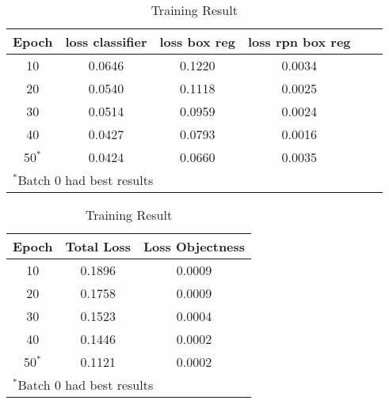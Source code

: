 \documentclass[conference]{IEEEtran}
\begin{document}
    \begin{table}[htbp]
        \centering
        \caption{Training Result}
            \begin{tabular}{|c|c|c|c|c|c|}
                \hline
                    \textbf{Epoch} & \textbf{loss classifier} & \textbf{loss box reg} & \textbf{loss rpn box reg} \\
                \hline
                    10 & 0.0646 & 0.1220 & 0.0034\\
                \hline
                    20 & 0.0540 & 0.1118 & 0.0025\\
                \hline
                    30 & 0.0514 & 0.0959 & 0.0024\\
                \hline
                    40 & 0.0427 & 0.0793 & 0.0016\\
                \hline
                    50$^{\mathrm{*}}$ & 0.0424 & 0.0660 & 0.0035\\
                \hline
                \multicolumn{4}{l}{$^{\mathrm{*}}$Batch 0 had best results} \\
            \end{tabular}            
    \end{table}

    \begin{table}[htbp]
        \centering
        \caption{Training Result}
            \begin{tabular}{|c|c|c|}
                \hline
                    \textbf{Epoch} & \textbf{Total Loss} & \textbf{Loss Objectness} \\
                \hline
                    10 & 0.1896 & 0.0009 \\
                \hline
                    20 & 0.1758 & 0.0009 \\
                \hline 
                    30 & 0.1523 & 0.0004 \\
                \hline
                    40 & 0.1446 & 0.0002 \\
                \hline
                    50$^{\mathrm{*}}$ & 0.1121 & 0.0002 \\
                \hline
                \multicolumn{3}{l}{$^{\mathrm{*}}$Batch 0 had best results} \\
            \end{tabular}            
        \label{tab1}
    \end{table} 
\end{document}
